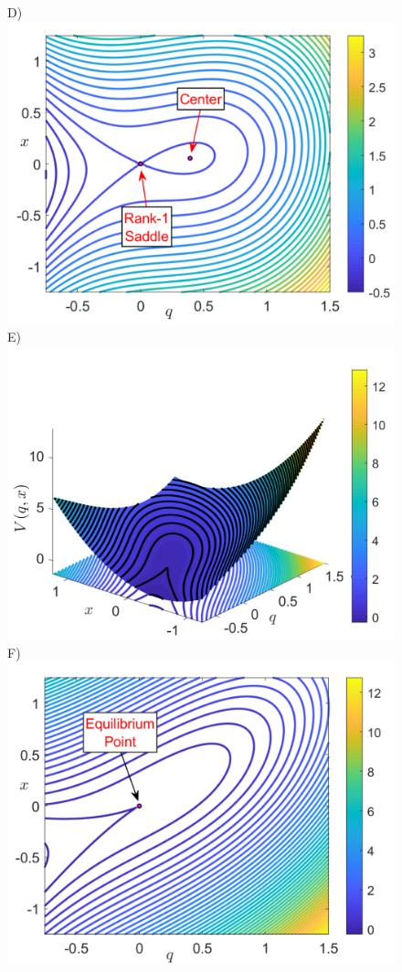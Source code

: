 \documentclass{ws-ijbc}
\begin{document}
\begin{figure}[htbp]
\begin{center}
	D)\includegraphics[scale=0.29]{fig5d}
	E)\includegraphics[scale=0.31]{fig5e}
	F)\includegraphics[scale=0.29]{fig5f}
	\end{center}


\end{figure}
\end{document}
